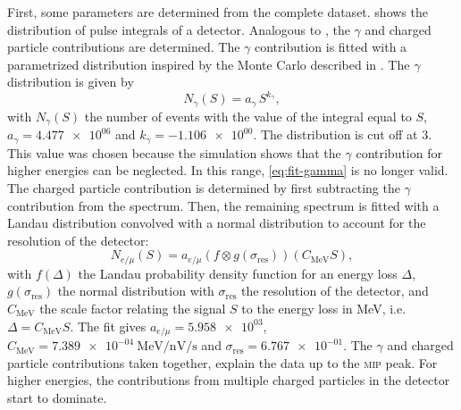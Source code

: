 First, some parameters are determined from the complete dataset.
 shows the distribution of pulse integrals
of a detector.
Analogous to , the $\gamma$ and
charged particle contributions are determined.  The $\gamma$ contribution is fitted with a
parametrized distribution inspired by the Monte Carlo described in
\cite{Pennink:2010}. The $\gamma$ distribution is given by
\begin{equation}
\label{eq:fit-gamma}
N_\gamma(S) = a_\gamma\, S^{k_\gamma},
\end{equation}
with $N_\gamma(S)$ the number of events with the value of the integral equal to
$S$, $a_\gamma = \num{4.477e+06}$ and $k_\gamma = -\num{1.106e+00}$. The
distribution is cut off at \SI{3}{\mip}. This value was chosen because the
simulation shows that the $\gamma$ contribution for higher energies can be
neglected.  In this range, \eqref{eq:fit-gamma} is no longer valid.
The charged particle contribution is determined by first subtracting the $\gamma$
contribution from the spectrum.  Then, the remaining spectrum is fitted with a
Landau distribution convolved with a normal distribution to account for the
resolution of the detector:
\begin{equation}
\label{eq:fit-charged}
N_{e/\mu}(S) = a_{e/\mu} (f \otimes g(\sigma_\mathrm{res}))
    (C_{\si{\mega\electronvolt}} S),
\end{equation}
with $f(\Delta)$ the Landau probability density function for an energy loss
$\Delta$, $g(\sigma_\mathrm{res})$ the normal distribution with
$\sigma_\mathrm{res}$ the resolution of the detector, and
$C_{\si{\mega\electronvolt}}$ the scale factor relating the signal $S$ to the
energy loss in \si{\mega\electronvolt}, i.e. $\Delta =
C_{\si{\mega\electronvolt}} S$.  The fit gives $a_{e/\mu} = \num{5.958e+03}$,
$C_{\si{\mega\electronvolt}} =
\SI{7.389e-04}{\mega\electronvolt\per\nano\volt\per\second}$ and
$\sigma_\mathrm{res} = \num{6.767e-01}$.  The $\gamma$ and charged particle
contributions taken together, explain the data up to the \textsc{mip} peak.
For higher energies, the contributions from multiple charged particles in the
detector start to dominate.

